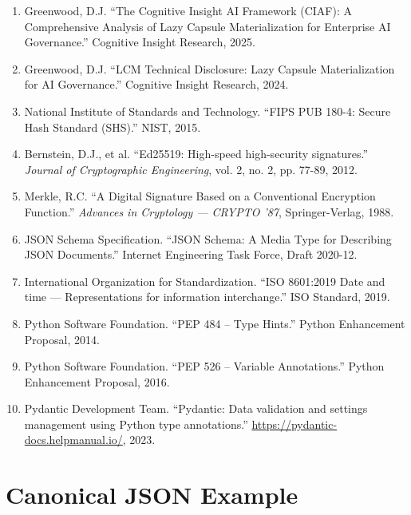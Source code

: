 \documentclass[12pt,a4paper]{article}
\begin{document}
\begin{enumerate}
\item Greenwood, D.J. ``The Cognitive Insight AI Framework (CIAF): A Comprehensive Analysis of Lazy Capsule Materialization for Enterprise AI Governance.'' Cognitive Insight Research, 2025.

\item Greenwood, D.J. ``LCM Technical Disclosure: Lazy Capsule Materialization for AI Governance.'' Cognitive Insight Research, 2024.

\item National Institute of Standards and Technology. ``FIPS PUB 180-4: Secure Hash Standard (SHS).'' NIST, 2015.

\item Bernstein, D.J., et al. ``Ed25519: High-speed high-security signatures.'' \textit{Journal of Cryptographic Engineering}, vol. 2, no. 2, pp. 77-89, 2012.

\item Merkle, R.C. ``A Digital Signature Based on a Conventional Encryption Function.'' \textit{Advances in Cryptology — CRYPTO '87}, Springer-Verlag, 1988.

\item JSON Schema Specification. ``JSON Schema: A Media Type for Describing JSON Documents.'' Internet Engineering Task Force, Draft 2020-12.

\item International Organization for Standardization. ``ISO 8601:2019 Date and time — Representations for information interchange.'' ISO Standard, 2019.

\item Python Software Foundation. ``PEP 484 -- Type Hints.'' Python Enhancement Proposal, 2014.

\item Python Software Foundation. ``PEP 526 -- Variable Annotations.'' Python Enhancement Proposal, 2016.

\item Pydantic Development Team. ``Pydantic: Data validation and settings management using Python type annotations.'' \url{https://pydantic-docs.helpmanual.io/}, 2023.
\end{enumerate}

\newpage

\section{Canonical JSON Example}
\end{document}
